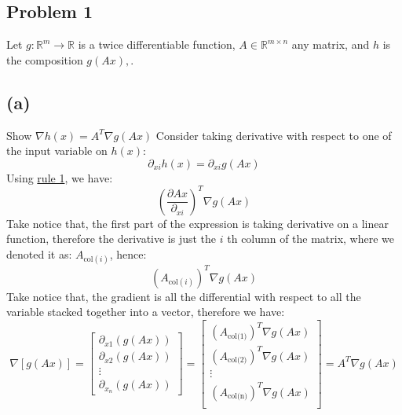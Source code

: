 \documentclass[]{article}
\begin{document}
\newpage
\subsection*{Problem 1}


\vspace{1em}
Let $g: \mathbb{R}^{m} \rightarrow \mathbb{R}$ is a twice differentiable function, $A \in \mathbb{R}^{m \times n}$ any matrix, and $h$ is the composition $g(A x),$.


\subsection*{(a)}
    Show $\nabla h(x) = A^T\nabla g(Ax)$
    Consider taking derivative with respect to one of the input variable on $h(x)$:
    $$
    \partial_{xi} h(x) = \partial_{xi} g(Ax)
    $$
    Using \hyperref[itm:rule1]{rule 1}, we have:
    $$
    \left(
        \frac{\partial Ax}{\partial_{xi}}
    \right)^T \nabla g(Ax)
    $$
    Take notice that, the first part of the expression is taking derivative on a linear function, therefore the derivative is just the $i$ th column of the matrix, where we denoted it as: $A_{\text{col}(i)}$, hence:
    $$
    (A_{\text{col}(i)})^T\nabla g(Ax)
    $$
    Take notice that, the gradient is all the differential with respect to all the variable stacked together into a vector, therefore we have:
    $$
        \nabla[g(Ax)]= \begin{bmatrix}
          \partial_{x1}(g(Ax))\\
          \partial_{x2}(g(Ax)) \\\vdots \\
          \partial_{x_n}(g(Ax))
        \end{bmatrix}
        =\begin{bmatrix}
          (A_{\text{col(1)}})^T \nabla g(Ax) \\
          (A_{\text{col(2)}})^T \nabla g(Ax) \\ \vdots \\
          (A_{\text{col(n)}})^T \nabla g(Ax) \\
        \end{bmatrix}=
        A^T\nabla g(Ax)
    $$
\end{document}

